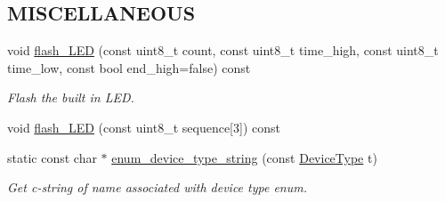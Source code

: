 \subsection*{M\+I\+S\+C\+E\+L\+L\+A\+N\+E\+O\+US}
\begin{DoxyCompactItemize}
\item 
void \hyperlink{class_loom_manager_afbe16976632be98771f6a5ede92ff3fe}{flash\+\_\+\+L\+ED} (const uint8\+\_\+t count, const uint8\+\_\+t time\+\_\+high, const uint8\+\_\+t time\+\_\+low, const bool end\+\_\+high=false) const 
\begin{DoxyCompactList}\small\item\em Flash the built in L\+ED. \end{DoxyCompactList}\item 
void \hyperlink{class_loom_manager_afcae7948a5a29d179842bcd00de271a0}{flash\+\_\+\+L\+ED} (const uint8\+\_\+t sequence\mbox{[}3\mbox{]}) const 
\item 
static const char $\ast$ \hyperlink{class_loom_manager_a2592362f66b24ced03f82e35643d1f12}{enum\+\_\+device\+\_\+type\+\_\+string} (const \hyperlink{class_loom_manager_a23170d165993ad196a7604fd08b29400}{Device\+Type} t)
\begin{DoxyCompactList}\small\item\em Get c-\/string of name associated with device type enum. \end{DoxyCompactList}\end{DoxyCompactItemize}
